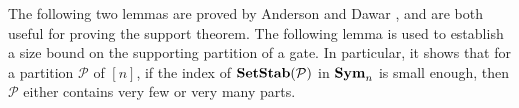 \documentclass[../paper.tex]{subfiles}
\begin{document}



The following two lemmas are proved by Anderson and Dawar \cite{AndersonD17},
and are both useful for proving the support theorem. The following lemma is used
to establish a size bound on the supporting partition of a gate. In particular,
it shows that for a partition $\mathcal{P}$ of $[n]$, if the index of $\text{\textbf{SetStab}}
(\mathcal{P})$ in $\text{\textbf{Sym}}_n$ is small enough, then $\mathcal{P}$ either contains
very few or very many parts.
\end{document}
